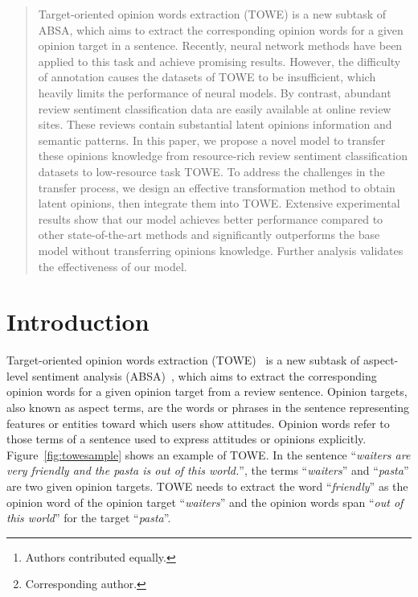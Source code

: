 \documentclass[letterpaper]{article} \usepackage{aaai20}  \usepackage{times}  \usepackage{helvet} \usepackage{courier}  \usepackage[hyphens]{url}  \usepackage{graphicx} \urlstyle{rm} \def\UrlFont{\rm}  \usepackage{graphicx}
\author{Zhen Wu\protect\thanks{Authors contributed equally.}, Fei Zhao\footnotemark[1], Xin-Yu Dai\protect\thanks{Corresponding author.}, Shujian Huang, Jiajun Chen\\ 
	National Key Laboratory for Novel Software Technology, Nanjing University, Nanjing, 210023, China\\
	Collaborative Innovation Center of Novel Software Technology and Industrialization, Nanjing, 210023, China\\
	\{wuz, zhaof\}@smail.nju.edu.cn, \{daixinyu,huangsj,chenjj\}@nju.edu.cn 
}
\begin{document}
\maketitle

\begin{abstract}
	Target-oriented opinion words extraction (TOWE) is a new subtask of ABSA, which aims to extract the corresponding opinion words for a given opinion target in a sentence. Recently, neural network methods have been applied to this task and achieve promising results. However, the difficulty of annotation causes the datasets of TOWE to be insufficient, which heavily limits the performance of neural models. By contrast, abundant review sentiment classification data are easily available at online review sites. These reviews contain substantial latent opinions information and semantic patterns. In this paper, we propose a novel model to transfer these opinions knowledge from resource-rich review sentiment classification datasets to low-resource task TOWE. To address the challenges in the transfer process, we design an effective transformation method to obtain latent opinions, then integrate them into TOWE. Extensive experimental results show that our model achieves better performance compared to other state-of-the-art methods and significantly outperforms the base model without transferring opinions knowledge. Further analysis validates the effectiveness of our model.
\end{abstract}

\section{Introduction}
Target-oriented opinion words extraction (TOWE)~\cite{DBLP:conf/naacl/FanWDHC19} is a new subtask of aspect-level sentiment analysis  (ABSA)~\cite{INR-011,DBLP:series/synthesis/2012Liu,DBLP:conf/semeval/PontikiGPPAM14}, which aims to extract the corresponding opinion words for a given opinion target from a review sentence. Opinion targets, also known as aspect terms, are the words or phrases in the sentence representing features or entities toward which users show attitudes. Opinion words refer to those terms of a sentence used to express attitudes or opinions explicitly. Figure~\ref{fig:towesample} shows an example of TOWE. In the sentence ``\emph{waiters are very friendly and the pasta is out of this world.}'', the terms ``\emph{waiters}'' and ``\emph{pasta}'' are two given opinion targets. TOWE needs to extract the word ``\emph{friendly}'' as the opinion word of the opinion target ``\emph{waiters}'' and the opinion words span ``\emph{out of this world}'' for the target ``\emph{pasta}''.
\end{document}
